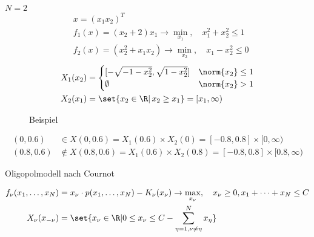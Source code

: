 \begin{beispiel} \label{ex:4-2} %
  $N = 2$
  \begin{align*}
    &x = (x_{1} x_{2})^{T}\\
    &f_{1}(x) = (x_{2} + 2)x_{1} \to \min_{x_{1}}, \quad x_{1}^{2} + x_{2}^{2} \leq 1\\
    &f_{2}(x) = (x_{2}^{2} + x_{1}x_{2}) \to \min_{x_{2}}, \quad x_{1} - x_{2}^{2} \leq 0
  \end{align*}
  \begin{align*}
    X_{1}(x_{2}) &=    \begin{cases}
      [- \sqrt{-1 - x_{2}^{2}}, \sqrt{1- x_{2}^{2}}] & \norm{x_{2}}\leq 1\\
      \emptyset & \norm{x_{2}} > 1 \end{cases}\\
    X_{2}(x_{1}) &= \set{x_{2} \in \R| \, x_{2} \geq x_{1}} = [x_{1}, \infty)
  \end{align*}
  \begin{figure}[h!]
    \centering
    \caption{Beispiel}
  \end{figure}
  \begin{align*}
    (0, 0.6) &\in X(0, 0.6) = X_{1}(0.6) \times X_{2}(0) = [-0.8, 0.8] \times [0, \infty)\\
    (0.8, 0.6) &\notin X(0.8, 0.6) = X_{1}(0.6) \times X_{2}(0.8) = [-0.8, 0.8] \times [0.8, \infty)
  \end{align*}
\end{beispiel}
\begin{beispiel}\label{ex:4-3} %
  Oligopolmodell nach Cournot

  \begin{align*}
    f_{\nu}(x_{1}, \dots, x_{N}) &= x_{\nu} \cdot p(x_{1}, \dots, x_{N}) - K_{\nu}(x_{\nu}) \to \max_{x_{\nu}}, \quad x_{\nu} \geq 0, x_{1} + \dots + x_{N} \leq C\\
X_{\nu}(x_{-\nu}) &= \set{x_{\nu} \in \R| 0 \leq x_{\nu}\leq C - \sum_{\eta = 1, \nu \neq \eta}^{N}x_{\eta}}
  \end{align*}
\end{beispiel}
